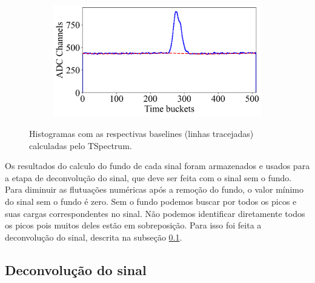 \documentclass[a4paper,12pt,oneside]{book}
\begin{document}
\begin{figure}[H]
\begin{subfigure}[b]{0.48\textwidth}
        \caption{}
        \label{subfig:ex_sinal_bkg_3}
    \end{subfigure}%
    \hfill
    \begin{subfigure}[b]{0.48\textwidth}
        \centering
        \includegraphics[scale=0.394]{figs/ex_sinal_bkg_4.png}
        \caption{}
        \label{subfig:ex_sinal_bkg_4}
    \end{subfigure}
\caption{Histogramas com as respectivas baselines (linhas tracejadas) calculadas pelo TSpectrum.}
\label{fig:ex_sinal_bkg}
\end{figure}

\par Os resultados do calculo do fundo de cada sinal foram armazenados e usados para a etapa de deconvolução do sinal, que deve ser feita com o sinal sem o fundo. Para diminuir as flutuações numéricas após a remoção do fundo, o valor mínimo do sinal sem o fundo é zero. Sem o fundo podemos buscar por todos os picos e suas cargas correspondentes no sinal. Não podemos identificar diretamente todos os picos pois muitos deles estão em sobreposição. Para isso foi feita a deconvolução do sinal, descrita na subseção \ref{subsec:pulses_deconv}.



\subsection{Deconvolução do sinal}\label{subsec:pulses_deconv}

\end{document}
